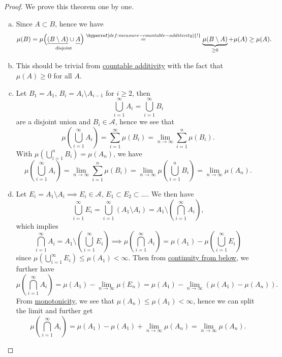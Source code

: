 \begin{proof}
	We prove this theorem one by one.
	\begin{enumerate}[(a)]
		\item Since \(A\subset B\), hence we have
		      \[
			      \mu(B) = \mu\underset{\text{disjoint} }{\left(\underline{(B\setminus A)}\cup \underline{\vphantom{(B\setminus A)}A}\right)} \overset{\hyperref[def:measure-countable-additivity]{!}}{=} \underbrace{\mu(B\setminus A)}_{\geq 0} + \mu(A) \geq \mu(A).
		      \]
		\item This should be trivial from \hyperref[def:measure-countable-additivity]{countable additivity} with the fact that \(\mu(A)\geq 0\) for all \(A\). 
		\item Let \(B_1 = A_1\), \(B_{i} = A_{i} \setminus A_{i-1}\) for \(i\geq 2\), then
		      \[
			      \bigcup_{i=1}^{\infty} A_{i} = \bigcup_{i=1}^{\infty} B_{i}
		      \]
		      are a disjoint union and \(B_{i}\in \mathcal{A}\), hence we see that
		      \[
			      \mu\left(\bigcup_{i=1}^{\infty} A_{i}\right) = \sum_{i=1}^{\infty} \mu(B_{i}) = \lim_{n \to \infty} \sum_{i=1}^{n} \mu(B_{i}).
		      \]
		      With \(\mu\left(\bigcup_{i=1}^{n} B_{i}\right) = \mu(A_{n})\), we have
		      \[
			      \mu\left(\bigcup_{i=1}^{\infty} A_{i}\right) = \lim_{n \to \infty} \sum_{i=1}^{n} \mu(B_{i}) = \lim_{n \to \infty} \mu\left(\bigcup_{i=1}^{n} B_{i}\right) = \lim_{n \to \infty} \mu(A_{n}).
		      \]
		\item Let \(E_{i} = A_{1} \setminus A_{i} \implies E_{i}\in \mathcal{A}\), \(E_1\subset E_2\subset \dots\). We then have
		      \[
			      \bigcup_{i=1}^{\infty} E_{i} = \bigcup_{i=1}^{\infty} \left(A_1 \setminus A_{i}\right) = A_1 \setminus \left(\bigcap_{i=1}^{\infty} A_{i}\right),
		      \]
		      which implies
		      \[
			      \bigcap_{i=1}^{\infty} A_{i} = A_1 \setminus \left(\bigcup_{i=1}^{\infty} E_{i}\right) \implies \mu\left(\bigcap_{i=1}^{\infty} A_{i}\right) = \mu(A_1) - \mu\left(\bigcup_{i=1}^{\infty} E_{i}\right)
		      \]
		      since \(\mu\left(\bigcup_{i=1}^{\infty} E_{i}\right) \leq \mu(A_1) < \infty \). Then from \hyperref[thm:measure-space-continuity-from-below]{continuity from below}, we further have
		      \[
			      \mu\left(\bigcap_{i=1}^{\infty} A_{i}\right) = \mu(A_1) - \lim_{n \to \infty} \mu(E_{n}) = \mu(A_1) - \lim_{n \to \infty} \left(\mu(A_1) - \mu(A_{n})\right).
		      \]
		      From \hyperref[thm:measure-space-monotonicity]{monotonicity}, we see that \(\mu(A_{n})\leq \mu(A_1) < \infty\), hence we can split the limit and further get
		      \[
			      \mu\left(\bigcap_{i=1}^{\infty} A_{i}\right) = \mu(A_1) - \mu(A_1) + \lim_{n \to \infty} \mu(A_{n}) = \lim_{n \to \infty} \mu(A_{n}).
		      \]
	\end{enumerate}
\end{proof}
